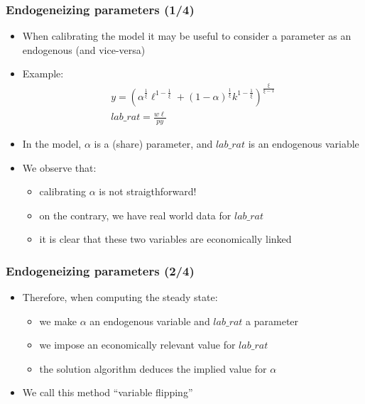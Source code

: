 \documentclass{beamer}
\begin{document}
\begin{frame}
  \frametitle{Endogeneizing parameters (1/4)}
  \begin{itemize}
  \item When calibrating the model it may be useful to consider a parameter as an endogenous (and vice-versa)
  \item Example:
    \begin{gather*}
      y = \left(\alpha^{\frac{1}{\xi}} \ell^{1-\frac{1}{\xi}} + (1-\alpha)^{\frac{1}{\xi}}k^{1-\frac{1}{\xi}}\right)^{\frac{\xi}{\xi - 1}} \\
      lab\_rat = \frac{w \ell}{p y}
    \end{gather*}
  \item In the model, $\alpha$ is a (share) parameter, and $lab\_rat$ is an endogenous variable
  \item We observe that:
    \begin{itemize}
    \item calibrating $\alpha$ is not straigthforward!
    \item on the contrary, we have real world data for $lab\_rat$
    \item it is clear that these two variables are economically linked
    \end{itemize}
  \end{itemize}
\end{frame}

\begin{frame}[fragile=singleslide]
  \frametitle{Endogeneizing parameters (2/4)}
  \begin{itemize}
  \item Therefore, when computing the steady state:
    \begin{itemize}
    \item we make $\alpha$ an endogenous variable and $lab\_rat$ a parameter
    \item we impose an economically relevant value for $lab\_rat$
    \item the solution algorithm deduces the implied value for $\alpha$
    \end{itemize}
  \item We call this method ``variable flipping''
  \end{itemize}
\end{frame}
\end{document}
